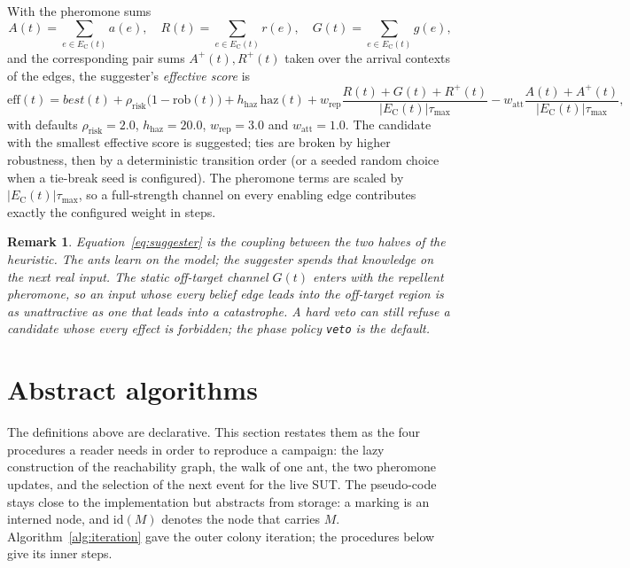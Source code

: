 \documentclass[11pt,a4paper]{article}
\newtheorem{remark}[definition]{Remark}
\newcommand{\Tau}{\tau_{\max}}
\begin{document}
With the pheromone sums
\[
  A(t)=\sum_{e\in E_{\mathrm{C}}(t)}a(e),\quad
  R(t)=\sum_{e\in E_{\mathrm{C}}(t)}r(e),\quad
  G(t)=\sum_{e\in E_{\mathrm{C}}(t)}g(e),
\]
and the corresponding pair sums $A^{+}(t),R^{+}(t)$ taken over the arrival
contexts of the edges, the suggester's \emph{effective score} is
\[
  \mathrm{eff}(t)=
  \mathit{best}(t)
  + \rho_{\mathrm{risk}}\bigl(1-\mathrm{rob}(t)\bigr)
  + h_{\mathrm{haz}}\,\mathrm{haz}(t)
  + w_{\mathrm{rep}}\frac{R(t)+G(t)+R^{+}(t)}{|E_{\mathrm{C}}(t)|\Tau}
  - w_{\mathrm{att}}\frac{A(t)+A^{+}(t)}{|E_{\mathrm{C}}(t)|\Tau},
  \label{eq:suggester}
\]
with defaults $\rho_{\mathrm{risk}}=2.0$, $h_{\mathrm{haz}}=20.0$,
$w_{\mathrm{rep}}=3.0$ and $w_{\mathrm{att}}=1.0$.  The candidate with the
smallest effective score is suggested; ties are broken by higher robustness,
then by a deterministic transition order (or a seeded random choice when a
tie-break seed is configured).  The pheromone terms are scaled by
$|E_{\mathrm{C}}(t)|\Tau$, so a full-strength channel on every enabling edge
contributes exactly the configured weight in steps.

\begin{remark}
Equation~\eqref{eq:suggester} is the coupling between the two halves of the
heuristic.  The ants learn on the model; the suggester spends that knowledge
on the next real input.  The static off-target channel $G(t)$ enters with the
repellent pheromone, so an input whose every belief edge leads into the
off-target region is as unattractive as one that leads into a catastrophe.  A
hard veto can still refuse a candidate whose every effect is forbidden; the
phase policy \texttt{veto} is the default.
\end{remark}

\section{Abstract algorithms}\label{sec:algorithms}

The definitions above are declarative.  This section restates them as the four
procedures a reader needs in order to reproduce a campaign: the lazy
construction of the reachability graph, the walk of one ant, the two pheromone
updates, and the selection of the next event for the live SUT.  The
pseudo-code stays close to the implementation but abstracts from storage: a
marking is an interned node, and $\mathrm{id}(M)$ denotes the node that
carries $M$.  Algorithm~\ref{alg:iteration} gave the outer colony iteration;
the procedures below give its inner steps.
\end{document}
